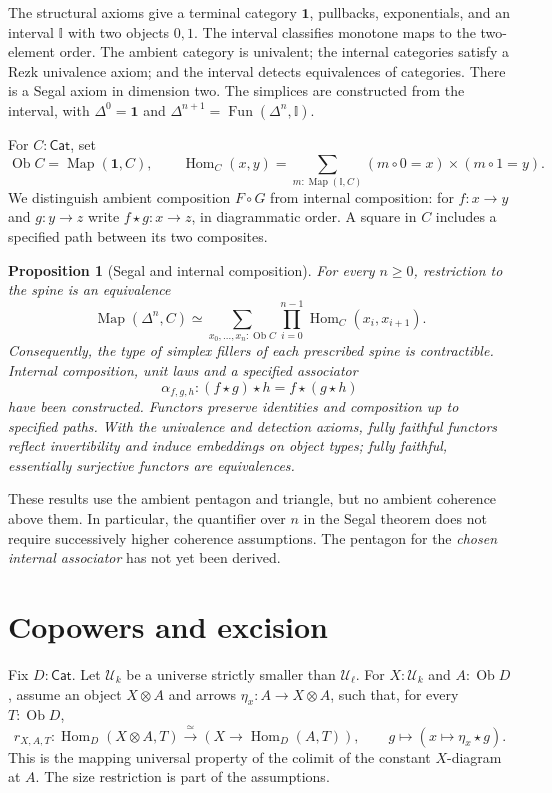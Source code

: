 \documentclass[11pt,a4paper]{amsart}
\newtheorem{proposition}{Proposition}[section]
\theoremstyle{definition}
\newcommand{\Cat}{\mathsf{Cat}}
\newcommand{\Map}{\operatorname{Map}}
\newcommand{\Hom}{\operatorname{Hom}}
\newcommand{\Ob}{\operatorname{Ob}}
\newcommand{\Fun}{\operatorname{Fun}}
\newcommand{\U}{\mathcal U}
\newcommand{\I}{\mathbb I}
\newcommand{\pt}{\mathbf 1}
\newcommand{\comp}[2]{#1\mathbin{\star}#2}
\begin{document}
The structural axioms give a terminal category $\pt$, pullbacks,
exponentials, and an interval $\I$ with two objects $0,1$. The interval
classifies monotone maps to the two-element order. The ambient category
is univalent; the internal categories satisfy a Rezk univalence axiom;
and the interval detects equivalences of categories. There is a Segal
axiom in dimension two. The simplices are constructed from the interval,
with $\Delta^0=\pt$ and $\Delta^{n+1}=\Fun(\Delta^n,\I)$.

For $C:\Cat$, set
\[
 \Ob C=\Map(\pt,C),\qquad
 \Hom_C(x,y)=\sum_{m:\Map(\I,C)}(m\circ0=x)\times(m\circ1=y).
\]
We distinguish ambient composition $F\circ G$ from internal composition:
for $f:x\to y$ and $g:y\to z$ write $\comp f g:x\to z$, in diagrammatic
order. A square in $C$ includes a specified path between its two composites.

\begin{proposition}[Segal and internal composition]
For every $n\geq0$, restriction to the spine is an equivalence
\[
 \Map(\Delta^n,C)\simeq
 \sum_{x_0,\ldots,x_n:\Ob C}\prod_{i=0}^{n-1}\Hom_C(x_i,x_{i+1}).
\]
Consequently, the type of simplex fillers of each prescribed spine is
contractible. Internal composition, unit laws and a specified associator
\[
 \alpha_{f,g,h}:\comp{(\comp f g)}h=\comp f{(\comp g h)}
\]
have been constructed. Functors preserve identities and composition up to
specified paths. With the univalence and detection axioms, fully faithful
functors reflect invertibility and induce embeddings on object types;
fully faithful, essentially surjective functors are equivalences.
\end{proposition}

These results use the ambient pentagon and triangle, but no ambient
coherence above them. In particular, the quantifier over $n$ in the Segal
theorem does not require successively higher coherence assumptions.
The pentagon for the \emph{chosen internal associator} has not yet been
derived.

\section{Copowers and excision}

Fix $D:\Cat$. Let $\U_k$ be a universe strictly smaller than $\U_\ell$.
For $X:\U_k$ and $A:\Ob D$, assume an object $X\otimes A$ and arrows
$\eta_x:A\to X\otimes A$, such that, for every $T:\Ob D$,
\begin{equation}\label{eq:copower}
 r_{X,A,T}:\Hom_D(X\otimes A,T)\xrightarrow{\ \simeq\ }
              (X\to\Hom_D(A,T)),\qquad
 g\longmapsto(x\longmapsto\comp{\eta_x}g).
\end{equation}
This is the mapping universal property of the colimit of the constant
$X$-diagram at $A$. The size restriction is part of the assumptions.
\end{document}
